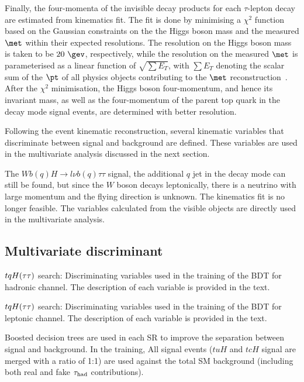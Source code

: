 Finally, the four-momenta of the invisible decay products for each $\tau$-lepton decay 
are estimated from kinematics fit. The fit is done by minimising a $\chi^2$ function based on the Gaussian constraints on the the Higgs boson mass and the
measured $\met$ within their expected resolutions. The resolution on the Higgs boson mass is taken to be $20~\gev$, respectively, while the resolution on the measured $\met$ is parameterised as a linear function of 
$\sqrt{\sum E_T}$, with $\sum E_T$ denoting the scalar sum of the $\pt$ of all physics objects contributing to the $\met$ reconstruction~\cite{Aaboud:2018tkc}.
After the $\chi^2$ minimisation, the Higgs boson four-momentum, and hence its invariant mass, as well as the 
four-momentum of the parent top quark in the decay mode signal events, are determined with better resolution. 

Following the event kinematic reconstruction, several kinematic variables that discriminate between signal and background are defined. These variables are used in the multivariate analysis discussed in the next section.

The $Wb(q)H\to l\nu b(q)\tau\tau$ signal, the additional $q$ jet in the decay mode can still be found, but since the $W$ boson decays leptonically, there is a neutrino with large momentum and the flying direction is unknown. The kinematics fit is no longer feasible. The variables calculated from the visible objects are directly used in the multivariate analysis.

\subsection{Multivariate discriminant}

\begin{table*}[t!]
\caption{\small{$tqH(\tau\tau)$ search: Discriminating variables used in the training of the BDT for hadronic channel. 
The description of each variable is provided in the text.}}

\end{table*}


\begin{table*}[t!]
\caption{\small{$tqH(\tau\tau)$ search: Discriminating variables used in the training of the BDT for leptonic channel. 
The description of each variable is provided in the text.}}

\end{table*}

Boosted decision trees are used in each SR to improve the separation between signal and background. 
In the training, All signal events ($tuH$ and $tcH$ signal are merged with a ratio of 1:1) are used against the total SM background (including both real and fake $\tau_{\mathrm{had}}$ contributions).

